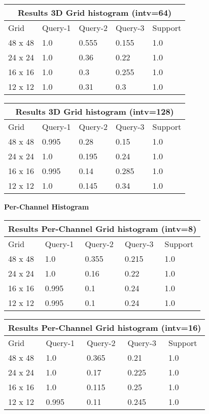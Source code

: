 \documentclass[12pt]{article}
\begin{document}
\begin{tabular}{ |p{1.5cm}||p{2cm}|p{2cm}|p{2cm}|p{2cm}|  }
    \hline
    \multicolumn{5}{|c|}{Results 3D Grid histogram (intv=64)} \\
    \hline
    Grid & Query-1 & Query-2 & Query-3 & Support \\
    \hline
    48 x 48 & 1.0 & 0.555 & 0.155 & 1.0 \\
    \hline
    24 x 24 & 1.0 & 0.36 & 0.22 & 1.0 \\
    \hline
    16 x 16 & 1.0 & 0.3 & 0.255 & 1.0 \\
    \hline
    12 x 12 & 1.0 & 0.31 & 0.3 & 1.0 \\
    \hline
\end{tabular}

\begin{tabular}{ |p{1.5cm}||p{2cm}|p{2cm}|p{2cm}|p{2cm}|  }
    \hline
    \multicolumn{5}{|c|}{Results 3D Grid histogram (intv=128)} \\
    \hline
    Grid & Query-1 & Query-2 & Query-3 & Support \\
    \hline
    48 x 48 & 0.995 & 0.28 & 0.15 & 1.0 \\
    \hline
    24 x 24 & 1.0 & 0.195 & 0.24 & 1.0 \\
    \hline
    16 x 16 & 0.995 & 0.14 & 0.285 & 1.0 \\
    \hline
    12 x 12 & 1.0 & 0.145 & 0.34 & 1.0 \\
    \hline
\end{tabular}

\pagebreak

\textbf{Per-Channel Histogram} \\ 

\begin{tabular}{ |p{1.5cm}||p{2cm}|p{2cm}|p{2cm}|p{2cm}|  }
    \hline
    \multicolumn{5}{|c|}{Results Per-Channel Grid histogram (intv=8)} \\
    \hline
    Grid & Query-1 & Query-2 & Query-3 & Support \\
    \hline
    48 x 48 & 1.0 & 0.355 & 0.215 & 1.0 \\
    \hline
    24 x 24 & 1.0 & 0.16 & 0.22 & 1.0 \\
    \hline
    16 x 16 & 0.995 & 0.1 & 0.24 & 1.0 \\
    \hline
    12 x 12 & 0.995 & 0.1 & 0.24 & 1.0 \\
    \hline
\end{tabular}

\begin{tabular}{ |p{1.5cm}||p{2cm}|p{2cm}|p{2cm}|p{2cm}|  }
    \hline
    \multicolumn{5}{|c|}{Results Per-Channel Grid histogram (intv=16)} \\
    \hline
    Grid & Query-1 & Query-2 & Query-3 & Support \\
    \hline
    48 x 48 & 1.0 & 0.365 & 0.21 & 1.0 \\
    \hline
    24 x 24 & 1.0 & 0.17 & 0.225 & 1.0 \\
    \hline
    16 x 16 & 1.0 & 0.115 & 0.25 & 1.0 \\
    \hline
    12 x 12 & 0.995 & 0.11 & 0.245 & 1.0 \\
    \hline
\end{tabular}
\end{document}
